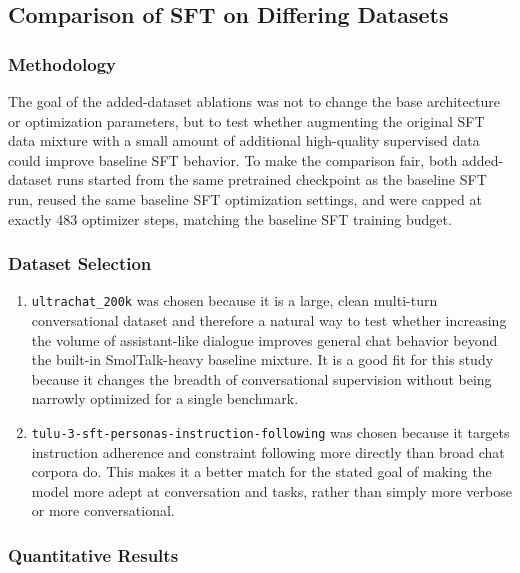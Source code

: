 \documentclass[a4paper,12pt]{article}
\begin{document}
\subsection{Comparison of SFT on Differing Datasets}

\subsubsection{Methodology}
The goal of the added-dataset ablations was not to change the base architecture or optimization parameters, but to test whether augmenting the original SFT data mixture with a small amount of additional high-quality supervised data could improve baseline SFT behavior. To make the comparison fair, both added-dataset runs started from the same pretrained checkpoint as the baseline SFT run, reused the same baseline SFT optimization settings, and were capped at exactly 483 optimizer steps, matching the baseline SFT training budget.

\subsubsection{Dataset Selection}

\begin{enumerate}[label=(\alph*)]
    \item \texttt{ultrachat\_200k} was chosen because it is a large, clean multi-turn conversational dataset and therefore a natural way to test whether increasing the volume of assistant-like dialogue improves general chat behavior beyond the built-in SmolTalk-heavy baseline mixture. It is a good fit for this study because it changes the breadth of conversational supervision without being narrowly optimized for a single benchmark.
    \item \texttt{tulu-3-sft-personas-instruction-following} was chosen because it targets instruction adherence and constraint following more directly than broad chat corpora do. This makes it a better match for the stated goal of making the model more adept at conversation and tasks, rather than simply more verbose or more conversational.
\end{enumerate}

\subsubsection{Quantitative Results}
\end{document}
